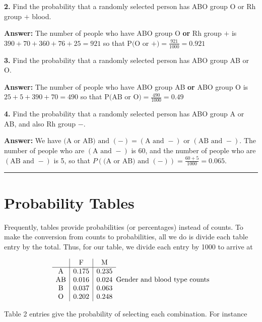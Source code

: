 \documentclass[
]{book}
\begin{document}
\textbf{2.} Find the probability that a randomly selected person has ABO group O
or Rh group \(+\) blood.

\textbf{Answer:} The number of people who have ABO group O \textbf{or} Rh group \(+\) is
\(390 + 70 + 360 + 76 + 25 = 921\) so that
\(\text{P(O or }+) = \frac{921}{1000} = 0.921\)

\textbf{3.} Find the probability that a randomly selected person has ABO group AB or O.

\textbf{Answer:} The number of people who have ABO group AB \textbf{or} ABO group O is
\(25 + 5 + 390 + 70 = 490\) so that
\(\text{P(AB or O)} = \frac{490}{1000} = 0.49\)

\textbf{4.} Find the probability that a randomly selected person has ABO group A or AB,
and also Rh group \(-\).

\textbf{Answer:}
We have \(\text{(A or AB) and }(-) = (\text{A and }-) \text{ or } (\text{AB and }-)\).
The number of people who are \((\text{A and }-)\) is 60, and the number of
people who are \((\text{AB and }-)\) is 5, so that
\(P(\text{(A or AB) and }(-)) = \frac{60+5}{1000} = 0.065\).

\begin{center}\rule{0.5\linewidth}{0.5pt}\end{center}

\hypertarget{probability-tables}{%
\section{Probability Tables}\label{probability-tables}}

Frequently, tables provide probabilities (or percentages) instead of counts.
To make the conversion from counts to probabilities, all we do is divide each table entry by the total.
Thus, for our table, we divide each entry by 1000 to arrive at

\[
\begin{array}{c|c|c}
           & \mathrm{F} & \mathrm{M}\\ \hline
\mathrm{A} & 0.175 & 0.235 \\ 
\mathrm{AB} & 0.016 & 0.024 \\ 
\mathrm{B} & 0.037 & 0.063 \\ 
\mathrm{O} & 0.202 & 0.248 \\ 
\end{array}\\
\mbox{Gender and blood type counts}
\]

Table 2 entries give the probability of selecting each combination. For instance
\end{document}
